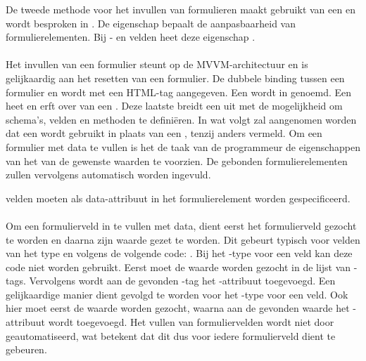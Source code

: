 De tweede methode voor het invullen van formulieren maakt gebruikt van een  en wordt besproken in .
De  eigenschap bepaalt de aanpasbaarheid van formulierelementen.
Bij - en velden heet deze eigenschap .


\paragraph{\kendo}
Het invullen van een formulier steunt op de MVVM-architectuur en is gelijkaardig aan het resetten van een formulier.
De dubbele binding tussen een formulier en  wordt met een HTML-tag aangegeven.
Een  wordt in \kendo{}  genoemd.
Een  heet  en erft over van een .
Deze laatste breidt een  uit met de mogelijkheid om schema's,  velden en methoden te definiëren.  
In wat volgt zal aangenomen worden dat een  wordt gebruikt in plaats van een ,  tenzij anders vermeld.
Om een formulier met data te vullen is het de taak van de programmeur de eigenschappen van het  van de gewenste waarden te voorzien.
De gebonden formulierelementen zullen vervolgens automatisch worden ingevuld.

 velden moeten als data-attribuut in het formulierelement worden gespecificeerd.

\paragraph{\jqm}
Om een formulierveld in te vullen met data, dient eerst het formulierveld gezocht te worden en daarna zijn waarde gezet te worden.
Dit gebeurt typisch voor velden van het type  en  volgens de volgende code: .
Bij het -type voor een veld kan deze code niet worden gebruikt.
Eerst moet de waarde worden gezocht in de lijst van -tags.
Vervolgens wordt aan de gevonden -tag het -attribuut toegevoegd.
Een gelijkaardige manier dient gevolgd te worden voor het -type voor een veld.
Ook hier moet eerst de waarde worden gezocht, waarna aan de gevonden waarde het -attribuut wordt toegevoegd.
Het vullen van formuliervelden wordt niet door \jqm{} geautomatiseerd, wat betekent dat dit dus voor iedere formulierveld dient te gebeuren.

